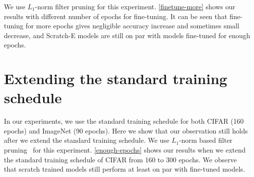 We use $L_1$-norm filter pruning \citep{li2016pruning} for this experiment. \autoref{finetune-more} shows our results with different number of epochs for fine-tuning. It can be seen that fine-tuning for more epochs gives negligible accuracy increase and sometimes small decrease, and Scratch-E models are still on par with models fine-tuned for enough epochs.




\section{Extending the standard training schedule}
In our experiments, we use the standard training schedule for both CIFAR (160 epochs) and ImageNet (90 epochs). Here we show that our observation still holds after we extend the standard training schedule. We use $L_1$-norm based filter pruning~\citep{li2016pruning} for this experiment. \autoref{enough-epochs} shows our results when we extend the standard training schedule of CIFAR from 160 to 300 epochs. We observe that scratch trained models still perform at least on par with fine-tuned models.

\setlength{\tabcolsep}{5pt}
\renewcommand{\arraystretch}{1.2}
\begin{table}[!htbp]
\small
\centering
{}
\vspace{1ex}
\caption{Results for $L_1$-norm filter pruning~\citep{li2016pruning} when the training schedule of the large model is extended from 160 to 300 epochs.
}
\label{enough-epochs}
\vspace{-3ex}
\end{table}


